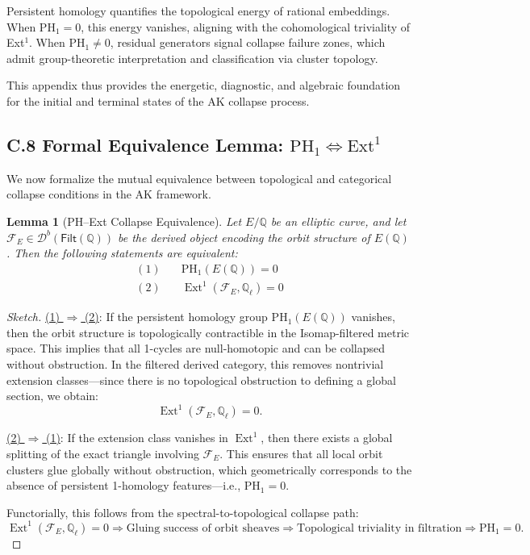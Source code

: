 \documentclass[11pt]{article}
\newtheorem{lemma}[theorem]{Lemma}
\theoremstyle{definition}
\begin{document}
Persistent homology quantifies the topological energy of rational embeddings.  
When \( \mathrm{PH}_1 = 0 \), this energy vanishes, aligning with the cohomological triviality of Ext$^1$.  
When \( \mathrm{PH}_1 \neq 0 \), residual generators signal collapse failure zones,  
which admit group-theoretic interpretation and classification via cluster topology.

This appendix thus provides the energetic, diagnostic, and algebraic foundation  
for the initial and terminal states of the AK collapse process.


\subsection*{C.8 Formal Equivalence Lemma: \texorpdfstring{$\mathrm{PH}_1 \Leftrightarrow \mathrm{Ext}^1$}{PH1 iff Ext1}}

We now formalize the mutual equivalence between topological and categorical collapse conditions in the AK framework.

\begin{lemma}[PH–Ext Collapse Equivalence]
\label{lem:ph-ext-equiv}
Let \( E/\mathbb{Q} \) be an elliptic curve, and let \( \mathcal{F}_E \in \mathcal{D}^b(\mathsf{Filt}(\mathbb{Q})) \) be the derived object encoding the orbit structure of \( E(\mathbb{Q}) \).  
Then the following statements are equivalent:
\begin{align*}
\mathrm{(1)}\quad & \mathrm{PH}_1(E(\mathbb{Q})) = 0 \\
\mathrm{(2)}\quad & \operatorname{Ext}^1(\mathcal{F}_E, \mathbb{Q}_\ell) = 0
\end{align*}
\end{lemma}

\begin{proof}[Sketch]
\underline{(1) $\Rightarrow$ (2)}:  
If the persistent homology group \( \mathrm{PH}_1(E(\mathbb{Q})) \) vanishes, then the orbit structure is topologically contractible in the Isomap-filtered metric space.  
This implies that all 1-cycles are null-homotopic and can be collapsed without obstruction.  
In the filtered derived category, this removes nontrivial extension classes—since there is no topological obstruction to defining a global section, we obtain:
\[
\operatorname{Ext}^1(\mathcal{F}_E, \mathbb{Q}_\ell) = 0.
\]

\underline{(2) $\Rightarrow$ (1)}:  
If the extension class vanishes in \( \operatorname{Ext}^1 \), then there exists a global splitting of the exact triangle involving \( \mathcal{F}_E \).  
This ensures that all local orbit clusters glue globally without obstruction, which geometrically corresponds to the absence of persistent 1-homology features—i.e., \( \mathrm{PH}_1 = 0 \).

Functorially, this follows from the spectral-to-topological collapse path:
\[
\operatorname{Ext}^1(\mathcal{F}_E, \mathbb{Q}_\ell) = 0 
\Rightarrow \text{Gluing success of orbit sheaves} 
\Rightarrow \text{Topological triviality in filtration} 
\Rightarrow \mathrm{PH}_1 = 0.
\]
\end{proof}
\end{document}
